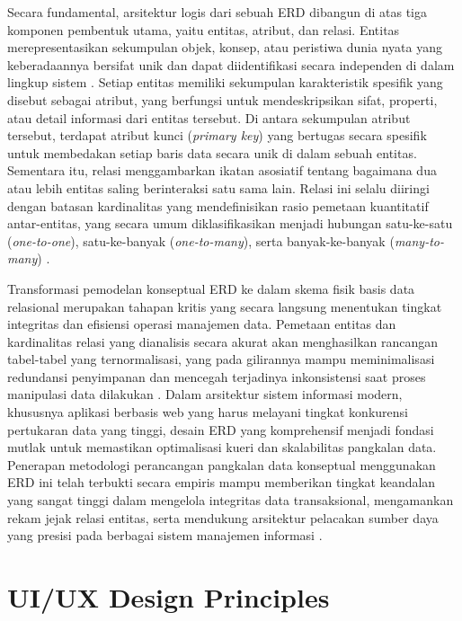 \documentclass[12pt,a4paper,twoside]{report}
\begin{document}
Secara fundamental, arsitektur logis dari sebuah ERD dibangun di atas tiga komponen pembentuk utama, yaitu entitas, atribut, dan relasi. Entitas merepresentasikan sekumpulan objek, konsep, atau peristiwa dunia nyata yang keberadaannya bersifat unik dan dapat diidentifikasi secara independen di dalam lingkup sistem \cite{silberschatz2019}. Setiap entitas memiliki sekumpulan karakteristik spesifik yang disebut sebagai atribut, yang berfungsi untuk mendeskripsikan sifat, properti, atau detail informasi dari entitas tersebut. Di antara sekumpulan atribut tersebut, terdapat atribut kunci (\textit{primary key}) yang bertugas secara spesifik untuk membedakan setiap baris data secara unik di dalam sebuah entitas. Sementara itu, relasi menggambarkan ikatan asosiatif tentang bagaimana dua atau lebih entitas saling berinteraksi satu sama lain. Relasi ini selalu diiringi dengan batasan kardinalitas yang mendefinisikan rasio pemetaan kuantitatif antar-entitas, yang secara umum diklasifikasikan menjadi hubungan satu-ke-satu (\textit{one-to-one}), satu-ke-banyak (\textit{one-to-many}), serta banyak-ke-banyak (\textit{many-to-many}) \cite{elmasri2015}.

Transformasi pemodelan konseptual ERD ke dalam skema fisik basis data relasional merupakan tahapan kritis yang secara langsung menentukan tingkat integritas dan efisiensi operasi manajemen data. Pemetaan entitas dan kardinalitas relasi yang dianalisis secara akurat akan menghasilkan rancangan tabel-tabel yang ternormalisasi, yang pada gilirannya mampu meminimalisasi redundansi penyimpanan dan mencegah terjadinya inkonsistensi saat proses manipulasi data dilakukan \cite{silberschatz2019}. Dalam arsitektur sistem informasi modern, khususnya aplikasi berbasis web yang harus melayani tingkat konkurensi pertukaran data yang tinggi, desain ERD yang komprehensif menjadi fondasi mutlak untuk memastikan optimalisasi kueri dan skalabilitas pangkalan data. Penerapan metodologi perancangan pangkalan data konseptual menggunakan ERD ini telah terbukti secara empiris mampu memberikan tingkat keandalan yang sangat tinggi dalam mengelola integritas data transaksional, mengamankan rekam jejak relasi entitas, serta mendukung arsitektur pelacakan sumber daya yang presisi pada berbagai sistem manajemen informasi \cite{adekunle2024}.

\section{UI/UX Design Principles}
\end{document}
